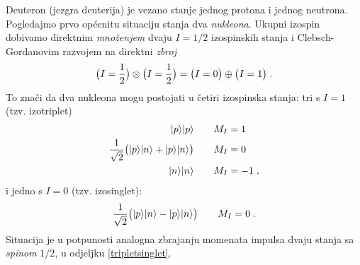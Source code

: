 \begin{primjer}[deuteron]

Deuteron (jezgra deuterija) je vezano stanje jednog protona i jednog
neutrona. Pogledajmo prvo općenitu situaciju stanja dva
\emph{nukleona}. Ukupni izospin dobivamo direktnim \emph{množenjem}
dvaju $I=1/2$ izospinskih stanja i Clebsch-Gordanovim razvojem na
direktni \emph{zbroj}
\begin{equation}
 \big(I=\frac{1}{2}\big) \otimes  \big(I=\frac{1}{2}\big) = 
\big(I=0\big) \oplus \big(I=1\big) \;.
\end{equation}
To znači da dva nukleona mogu postojati u četiri izospinska stanja:
tri s $I=1$ (tzv. izotriplet)
\begin{align}
  | p \rangle| p \rangle \qquad & M_I = 1 \\
  \frac{1}{\sqrt{2}} \big( | p \rangle| n \rangle+| p \rangle| n \rangle\big)
  \qquad & M_I = 0 \\
  | n \rangle| n \rangle \qquad & M_I = -1 \;,
\end{align}
i jedno s $I=0$ (tzv. izosinglet):
\begin{equation}
  \frac{1}{\sqrt{2}} \big( | p \rangle| n \rangle-| p \rangle| n \rangle\big)   \qquad  M_I = 0 \;.
\label{izosinglet}
\end{equation}
Situacija je u potpunosti analogna zbrajanju momenata impulsa
dvaju stanja sa \emph{spinom} $1/2$, u odjeljku \ref{tripletsinglet}.


\end{primjer}
